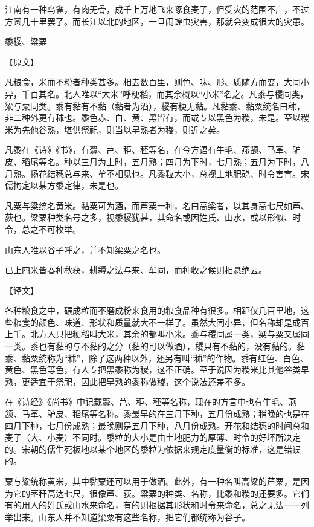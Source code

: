\documentclass[12pt,UTF8]{ctexbook}
\begin{document}
江南有一种鸟雀，有肉无骨，成千上万地飞来啄食麦子，但受灾的范围不广，不过方圆几十里罢了。而长江以北的地区，一旦闹蝗虫灾害，那就会变成很大的灾患。

黍稷、粱粟

【原文】

凡粮食，米而不粉者种类甚多。相去数百里，则色、味、形、质随方而变，大同小异，千百其名。北人唯以“大米”呼粳稻，而其余概以“小米”名之。凡黍与稷同类，粱与粟同类。黍有黏有不黏（黏者为酒），稷有粳无黏。凡黏黍、黏粟统名曰秫，非二种外更有秫也。黍色赤、白、黄、黑皆有，而或专以黑色为稷，未是。至以稷米为先他谷熟，堪供祭祀，则当以早熟者为稷，则近之矣。

凡黍在《诗》《书》，有虋、芑、秬、秠等名，在今方语有牛毛、燕颔、马革、驴皮、稻尾等名。种以三月为上时，五月熟；四月为下时，七月熟；五月为下时，八月熟。扬花结穗总与来、牟不相见也。凡黍粒大小，总视土地肥硗、时令害育。宋儒拘定以某方黍定律，未是也。

凡粟与粱统名黄米。黏粟可为酒，而芦粟一种，名曰高粱者，以其身高七尺如芦、荻也。粱粟种类名号之多，视黍稷犹甚，其命名或因姓氏、山水，或以形似、时令，总之不可枚举。

山东人唯以谷子呼之，并不知粱粟之名也。

已上四米皆春种秋获，耕耨之法与来、牟同，而种收之候则相悬绝云。

【译文】

各种粮食之中，碾成粒而不磨成粉来食用的粮食品种有很多。相距仅几百里地，这些粮食的颜色、味道、形状和质量就大不一样了。虽然大同小异，但名称却是成百上千。北方人只把粳稻叫大米，其余的都叫小米。黍与稷同属一类，粱与粟又属同一类。黍也有黏的与不黏的之分（黏的可以做酒），稷只有不黏的，没有黏的。黏黍、黏粟统称为“秫”，除了这两种以外，还另有叫“秫”的作物。黍有红色、白色、黄色、黑色等色，有人专把黑黍称为稷，这不正确。至于说因为稷米比其他谷类早熟，更适宜于祭祀，因此把早熟的黍称做稷，这个说法还差不多。

在《诗经》《尚书》中记载虋、芑、秬、秠等名称，现在的方言中也有牛毛、燕颔、马革、驴皮、稻尾等名称。黍最早的在三月下种，五月份成熟；稍晚的也是在四月下种，七月份成熟；最晚则是五月下种，八月份成熟。开花和结穗的时间总和麦子（大、小麦）不同时。黍粒的大小是由土地肥力的厚薄、时令的好坏所决定的。宋朝的儒生死板地以某个地区的黍粒为依据来规定度量衡的标准，这是错误的。

粟与粱统称黄米，其中黏粟还可以用于做酒。此外，有一种名叫高粱的芦粟，是因为它的茎秆高达七尺，很像芦、荻。粱粟的种类、名称，比黍和稷的还要多。它们有的用人的姓氏或山水来命名，有的则根据其形状和时令来命名，总之无法一一列举出来。山东人并不知道梁粟有这些名称，把它们都统称为谷子。
\end{document}

